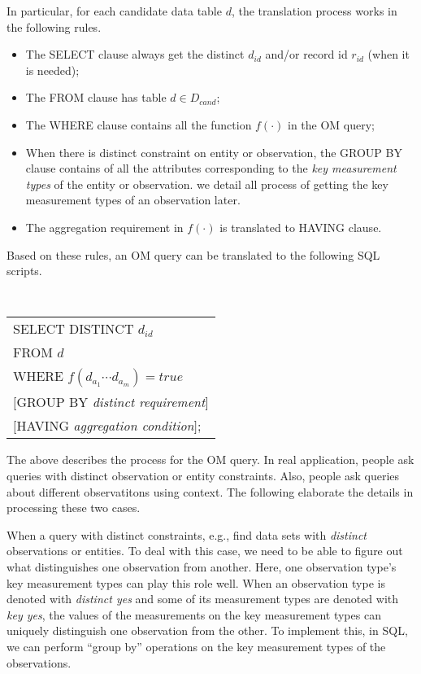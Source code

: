 In particular, for each candidate data table $d$,  
the translation process works in the following rules. 

\begin{itemize}
\item The SELECT clause always get the distinct $d_{id}$ and/or
  record id $r_{id}$ (when it is needed);
\item The FROM clause has table $d \in D_{cand}$;
\item The WHERE clause contains all the function $f(\cdot)$ in the OM
  query;
\item When there is distinct constraint on entity or observation, the
  GROUP BY clause contains of all the attributes corresponding to the
  {\em key measurement types} of the entity or observation. we detail
  all process of getting the key measurement types of an observation
  later. 
\item The aggregation requirement in $f(\cdot)$ is translated to
  HAVING clause. 
\end{itemize}

Based on these rules, an OM query can be translated to the following
SQL scripts. 

\vspace{0.1in}
{\tt 
\begin{tabular}{l} 
SELECT DISTINCT $d_{id}$\\
FROM $d$\\
WHERE $f(d_{a_1} \cdots d_{a_m}) = true$\\
$[$GROUP BY {\em distinct requirement}$]$\\
$[$HAVING {\em aggregation condition}$]$;
\end{tabular}
}
\vspace{0.1in}

The above describes the process for the OM query. 
In real application, people ask queries with distinct
observation or entity constraints. Also, people ask queries about
different observatitons using context. 
The following elaborate the details in processing these two cases. 

When a query with distinct constraints, e.g., find data sets with {\em distinct} observations or
entities. To deal with this case, 
we need to be able to figure out what distinguishes one observation
from another. Here, one observation type's key measurement types can
play this role well. 
When an observation type is denoted with {\em distinct yes} and some
of its measurement types are denoted with {\em key yes}, 
the values of the measurements on the key measurement types can
uniquely distinguish one observation from the other. 
To implement this, in SQL, we can perform ``group by'' operations on
the key measurement types of the observations. 

